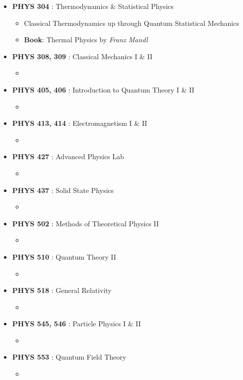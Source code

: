 \documentclass[10pt,a4paper,ragged2e]{altacv}
\begin{document}
\clearpage
\nocite{*}
\begin{itemize}
\item \textbf{PHYS 304} : Thermodynamics \& Statistical Physics
  \begin{itemize}
  \item Classical Thermodynamics up through Quantum Statistical Mechanics
  \item \textbf{Book}: Thermal Physics by \textit{Franz Mandl}
  \end{itemize}
\item \textbf{PHYS 308, 309} : Classical Mechanics I \& II
  \begin{itemize}
  \item 
  \end{itemize}
\item \textbf{PHYS 405, 406} : Introduction to Quantum Theory I \& II
  \begin{itemize}
  \item 
  \end{itemize}
\item \textbf{PHYS 413, 414} : Electromagnetism I \& II
  \begin{itemize}
  \item 
  \end{itemize}
\item \textbf{PHYS 427} : Advanced Physics Lab
  \begin{itemize}
  \item 
  \end{itemize}
\item \textbf{PHYS 437} : Solid State Physics
  \begin{itemize}
  \item 
  \end{itemize}
\item \textbf{PHYS 502} : Methods of Theoretical Physics II
  \begin{itemize}
  \item 
  \end{itemize}
\item \textbf{PHYS 510} : Quantum Theory II
  \begin{itemize}
  \item 
  \end{itemize}
\item \textbf{PHYS 518} : General Relativity
  \begin{itemize}
  \item 
  \end{itemize}
\item \textbf{PHYS 545, 546} : Particle Physics I \& II
  \begin{itemize}
  \item 
  \end{itemize}
\item \textbf{PHYS 553} : Quantum Field Theory
  \begin{itemize}
  \item 
  \end{itemize}
\end{itemize}
\end{document}
